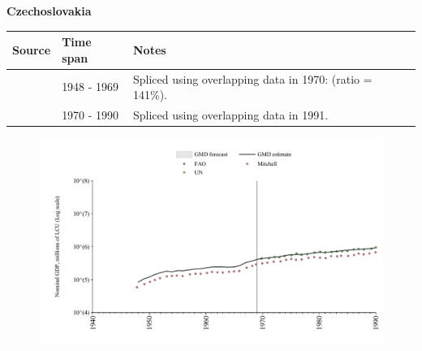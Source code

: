 \documentclass[12pt,a4paper,landscape]{article}
\begin{document}
\begin{adjustbox}{max totalsize={\paperwidth}{\paperheight},center}
\begin{minipage}[t][\textheight][t]{\textwidth}
\vspace*{0.5cm}
{}
\begin{center}
{\Large\bfseries Czechoslovakia}
\end{center}
\vspace{0.5cm}
\begin{table}[H]
\centering
\small
\begin{tabular}{|l|l|l|}
\hline
\textbf{Source} & \textbf{Time span} & \textbf{Notes} \\
\hline
\rowcolor{white}\cite{Mitchell}& 1948 - 1969 &Spliced using overlapping data in 1970: (ratio = 141\%).\\
\rowcolor{lightgray}\cite{UN}& 1970 - 1990 &Spliced using overlapping data in 1991.\\
\hline
\end{tabular}
\end{table}
\begin{figure}[H]
\centering
\includegraphics[width=\textwidth,height=0.6\textheight,keepaspectratio]{graphs/CSK_nGDP.pdf}
\end{figure}
\end{minipage}
\end{adjustbox}
\end{document}
